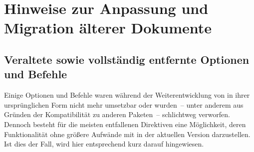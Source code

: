 \chapter{Hinweise zur Anpassung und Migration älterer Dokumente}
\section{%
  Veraltete sowie vollständig entfernte Optionen und Befehle%
  \label{sec:obsolete}%
}
%
Einige Optionen und Befehle waren während der Weiterentwicklung von \TUDScript
in ihrer ursprünglichen Form nicht mehr umsetzbar oder wurden~-- unter anderem 
aus Gründen der Kompatibilität zu anderen Paketen~-- schlichtweg verworfen. 
Dennoch besteht für die meisten entfallenen Direktiven eine Möglichkeit, deren 
Funktionalität ohne größere Aufwände mit \TUDScript in der aktuellen Version 
\vTUDScript{} darzustellen. Ist dies der Fall, wird hier entsprechend kurz 
darauf hingewiesen.



